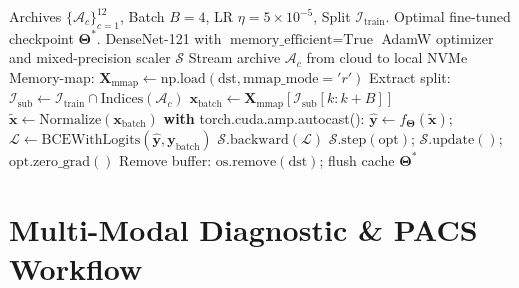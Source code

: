 \documentclass[conference]{IEEEtran}
\begin{document}
\begin{algorithm}[!t]
\caption{Out-of-Core Incremental Fine-Tuning Pipeline}
\label{alg:out_of_core}
\begin{algorithmic}[1]
\REQUIRE Archives $\{\mathcal{A}_c\}_{c=1}^{12}$, Batch $B=4$, LR $\eta = 5 \times 10^{-5}$, Split $\mathcal{I}_{\text{train}}$.
\ENSURE Optimal fine-tuned checkpoint $\mathbf{\Theta}^*$.
\STATE DenseNet-121 with $\text{memory\_efficient} = \text{True}$
\STATE AdamW optimizer and mixed-precision scaler $\mathcal{S}$
    \STATE Stream archive $\mathcal{A}_c$ from cloud to local NVMe
    \STATE Memory-map: $\mathbf{X}_{\text{mmap}} \leftarrow \text{np.load}(\text{dst}, \text{mmap\_mode}='r')$
    \STATE Extract split: $\mathcal{I}_{\text{sub}} \leftarrow \mathcal{I}_{\text{train}} \cap \text{Indices}(\mathcal{A}_c)$
        \STATE $\mathbf{x}_{\text{batch}} \leftarrow \mathbf{X}_{\text{mmap}}[\mathcal{I}_{\text{sub}}[k : k+B]]$
        \STATE $\tilde{\mathbf{x}} \leftarrow \text{Normalize}(\mathbf{x}_{\text{batch}})$
        \STATE \textbf{with} torch.cuda.amp.autocast():
        \STATE \quad $\hat{\mathbf{y}} \leftarrow f_{\mathbf{\Theta}}(\tilde{\mathbf{x}})$; $\mathcal{L} \leftarrow \text{BCEWithLogits}(\hat{\mathbf{y}}, \mathbf{y}_{\text{batch}})$
        \STATE $\mathcal{S}.\text{backward}(\mathcal{L})$
        \STATE $\mathcal{S}.\text{step}(\text{opt})$; $\mathcal{S}.\text{update}()$; $\text{opt.zero\_grad}()$
    \ENDFOR
    \STATE Remove buffer: $\text{os.remove}(\text{dst})$; flush cache
\ENDFOR
\RETURN $\mathbf{\Theta}^*$
\end{algorithmic}
\end{algorithm}

\section{Multi-Modal Diagnostic \& PACS Workflow}
\end{document}
